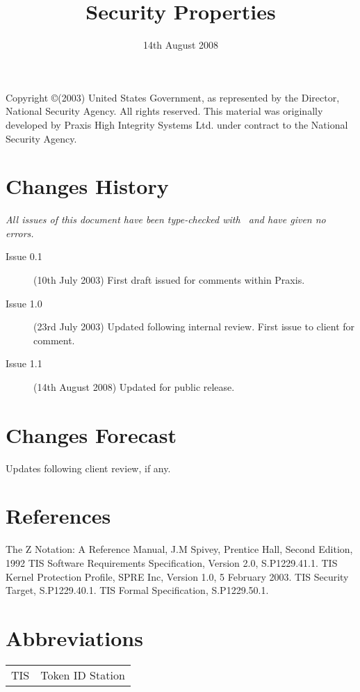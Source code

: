 \documentclass{pxcsdoc}
\title{Security Properties}
\date{14th August 2008}
\begin{document}
\maketitle
%


\documentcontrol
Copyright \copyright (2003) United States Government, as represented by the
Director, National Security Agency. All rights reserved.
This material was originally developed by Praxis High Integrity
Systems Ltd. under contract to the National Security Agency.
\section*{Changes History}
\textit{All issues of this document have been type-checked with \fuzz~and have
  given no errors.}
\begin{description}
\item [Issue 0.1] 
(10th July 2003) First draft issued for comments within Praxis.
\item [Issue 1.0] 
(23rd July 2003) Updated following internal review.
First issue to client for comment.
\item [Issue 1.1] 
(14th August 2008) Updated for public release.
\end{description}

\section*{Changes Forecast}

Updates following client review, if any.

\section*{References}
\begin{thebibliography}{99}
The Z Notation: A Reference Manual, J.M Spivey, Prentice Hall, Second Edition,
1992
TIS Software Requirements Specification, Version 2.0, S.P1229.41.1.
TIS Kernel Protection Profile, SPRE Inc, Version 1.0, 5 February 2003.
TIS Security Target, S.P1229.40.1.
TIS Formal Specification, S.P1229.50.1.
\end{thebibliography}

\section*{Abbreviations}
{\footnotesize\begin{tabular}{ll}
TIS          & Token ID Station \\
\end{tabular}}



\tableofcontents




\end{document}
